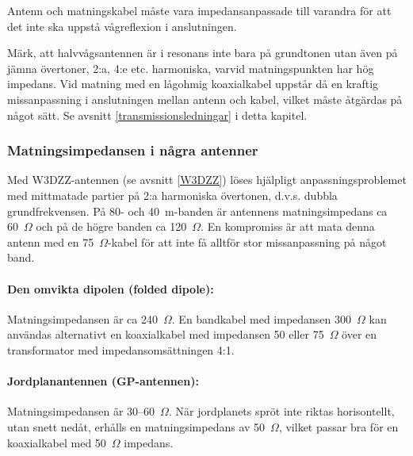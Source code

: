 Antenn och matningskabel måste vara impedansanpassade till varandra
för att det inte ska uppstå vågreflexion i anslutningen.

Märk, att halvvågsantennen är i resonans inte bara på grundtonen utan även på
jämna övertoner, 2:a, 4:e etc. harmoniska, varvid matningspunkten har hög
impedans.
Vid matning med en lågohmig koaxialkabel uppstår då en kraftig missanpassning i
anslutningen mellan antenn och kabel, vilket måste åtgärdas på något sätt.
Se avsnitt \ref{transmissionsledningar} i detta kapitel.

\subsubsection{Matningsimpedansen i några antenner}

Med W3DZZ-antennen (se avsnitt \ref{W3DZZ}) löses hjälpligt anpassningsproblemet
med mittmatade partier på 2:a harmoniska övertonen, d.v.s. dubbla
grundfrekvensen.
På 80- och 40~m-banden är antennens matningsimpedans ca 60~\(\Omega\) och på de
högre banden ca 120~\(\Omega\).
En kompromiss är att mata denna antenn med en 75~\(\Omega\)-kabel för att inte
få alltför stor missanpassning på något band.

\paragraph{Den omvikta dipolen (folded dipole):}

Matningsimpedansen är ca 240~\(\Omega\).
En bandkabel med impedansen 300~\(\Omega\) kan användas alternativt en
koaxialkabel med impedansen 50 eller 75~\(\Omega\) över en transformator med
impedansomsättningen 4:1.

\paragraph{Jordplanantennen (GP-antennen):}

Matningsimpedansen är 30--60~\(\Omega\).
När jordplanets spröt inte riktas horisontellt, utan snett nedåt, erhålls en
matningsimpedans av 50~\(\Omega\), vilket passar bra för en koaxialkabel med
50~\(\Omega\) impedans.

